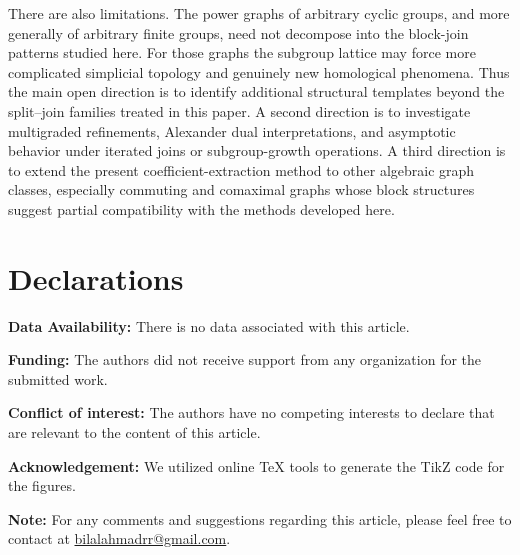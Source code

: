 \documentclass[12pt]{article}
\theoremstyle{definition}
\theoremstyle{remark}
\begin{document}
	There are also limitations. The power graphs of arbitrary cyclic groups, and more generally of arbitrary finite groups, need not decompose into the block-join patterns studied here. For those graphs the subgroup lattice may force more complicated simplicial topology and genuinely new homological phenomena. Thus the main open direction is to identify additional structural templates beyond the split--join families treated in this paper. A second direction is to investigate multigraded refinements, Alexander dual interpretations, and asymptotic behavior under iterated joins or subgroup-growth operations. A third direction is to extend the present coefficient-extraction method to other algebraic graph classes, especially commuting and comaximal graphs whose block structures suggest partial compatibility with the methods developed here.
	
	\section*{Declarations}
	\noindent \textbf{Data Availability:} There is no data associated with this article.
	
	\noindent \textbf{Funding:} The authors did not receive support from any organization for the submitted work.
	
	\noindent \textbf{Conflict of interest:} The authors have no competing interests to declare that are relevant to the content of this article.
	
	\noindent \textbf{Acknowledgement:} We utilized online TeX tools to generate the TikZ code for the figures.
	
	\noindent\textbf{Note:} For any comments and suggestions regarding this article, please feel free to contact at \href{mailto:bilalahmadrr@gmail.com}{bilalahmadrr@gmail.com}.
	
\end{document}

